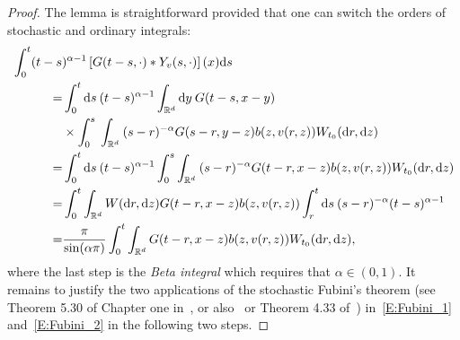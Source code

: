 \documentclass[sn-mathphys]{sn-jnl}%
\newcommand{\BR}{\mathbb{R}}
\newcommand{\ud}{\ensuremath{\mathrm{d}}}
\numberwithin{equation}{section}
\theoremstyle{thmstyleone}%
\theoremstyle{thmstyletwo}%
\theoremstyle{thmstylethree}%
\begin{document}
\begin{proof}
  The lemma is straightforward provided that one can switch the orders of stochastic and ordinary
  integrals:
  \begin{align}
    \MoveEqLeft[4] \int_0^t (t-s)^{\alpha-1}\left[G(t-s,\cdot)*Y_v(s,\cdot)\right](x) \ud s \notag \\
    = & \int_0^t \ud s\: (t-s)^{\alpha-1}\int_{\BR^d} \ud y\: G(t-s,x-y) \notag                                                                \\
      & \times \int_0^s\: \int_{\BR^d} \: (s-r)^{-\alpha}G(s-r,y-z)b(z,v(r,z))W_{t_0}(\ud r,\ud z) \notag                                      \\
    = & \int_0^t \ud s\: (t-s)^{\alpha-1} \int_0^s \int_{\BR^d} \: (s-r)^{-\alpha}G(t-r,x-z)b(z,v(r,z))W_{t_0}(\ud r,\ud z) \label{E:Fubini_1} \\
    = & \int_0^t \int_{\BR^d} W(\ud r,\ud z)G(t-r,x-z)b(z,v(r,z)) \int_r^t \ud s\: (s-r)^{-\alpha} (t-s)^{\alpha-1}\label{E:Fubini_2}          \\
    = & \dfrac{\pi}{\sin(\alpha \pi)}\int_0^t \int_{\BR^d} G(t-r,x-z)b(z,v(r,z)) W_{t_0}(\ud r,\ud z),\notag
  \end{align}
  where the last step is the \textit{Beta integral} which requires that $\alpha\in (0,1)$. It
  remains to justify the two applications of the stochastic Fubini's theorem (see Theorem 5.30 of
  Chapter one in~\cite{dalang.khoshnevisan.ea:09:minicourse}, or also~\cite{walsh:86:introduction}
  or Theorem 4.33 of~\cite{da-prato.zabczyk:14:stochastic}) in~\eqref{E:Fubini_1}
  and~\eqref{E:Fubini_2} in the following two steps. \bigskip


\end{proof}
\end{document}
